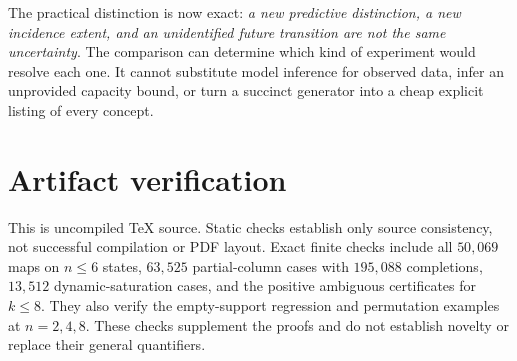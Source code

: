 \documentclass[11pt]{article}
\theoremstyle{remark}
\begin{document}
The practical distinction is now exact: \emph{a new predictive distinction, a new incidence extent, and an unidentified future transition are not the same uncertainty}. The comparison can determine which kind of experiment would resolve each one. It cannot substitute model inference for observed data, infer an unprovided capacity bound, or turn a succinct generator into a cheap explicit listing of every concept.

\section*{Artifact verification}
This is uncompiled TeX source. Static checks establish only source consistency, not successful compilation or PDF layout. Exact finite checks include all $50{,}069$ maps on $n\le6$ states, $63{,}525$ partial-column cases with $195{,}088$ completions, $13{,}512$ dynamic-saturation cases, and the positive ambiguous certificates for $k\le8$. They also verify the empty-support regression and permutation examples at $n=2,4,8$. These checks supplement the proofs and do not establish novelty or replace their general quantifiers.
\end{document}
